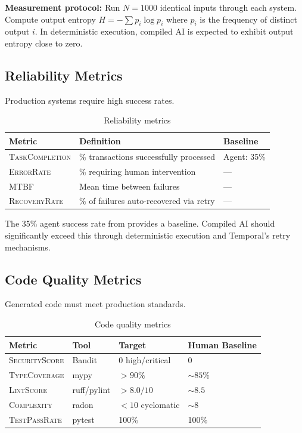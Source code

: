 \documentclass[11pt]{article}
\newcommand{\metric}[1]{\textsc{#1}}
\begin{document}
\textbf{Measurement protocol:} Run $N=1000$ identical inputs through each system. Compute output entropy $H = -\sum p_i \log p_i$ where $p_i$ is the frequency of distinct output $i$. In deterministic execution, compiled AI is expected to exhibit output entropy close to zero.

\subsection{Reliability Metrics}

Production systems require high success rates.

\begin{table}[ht]
\centering
\caption{Reliability metrics}
\label{tab:reliability-metrics}
\begin{tabular}{p{3.5cm}p{5.5cm}p{3cm}}
\toprule
Metric & Definition & Baseline \\
\midrule
\metric{TaskCompletion} & \% transactions successfully processed & Agent: 35\% \\
\metric{ErrorRate} & \% requiring human intervention & --- \\
\metric{MTBF} & Mean time between failures & --- \\
\metric{RecoveryRate} & \% of failures auto-recovered via retry & --- \\
\bottomrule
\end{tabular}
\end{table}

The 35\% agent success rate from \citet{salesforce2025agents} provides a baseline. Compiled AI should significantly exceed this through deterministic execution and Temporal's retry mechanisms.

\subsection{Code Quality Metrics}

Generated code must meet production standards.

\begin{table}[ht]
\centering
\caption{Code quality metrics}
\label{tab:quality-metrics}
\begin{tabular}{p{3.5cm}p{3cm}p{3cm}p{2.5cm}}
\toprule
Metric & Tool & Target & Human Baseline \\
\midrule
\metric{SecurityScore} & Bandit & 0 high/critical & 0 \\
\metric{TypeCoverage} & mypy & $> 90\%$ & $\sim 85\%$ \\
\metric{LintScore} & ruff/pylint & $> 8.0/10$ & $\sim 8.5$ \\
\metric{Complexity} & radon & $< 10$ cyclomatic & $\sim 8$ \\
\metric{TestPassRate} & pytest & 100\% & 100\% \\
\bottomrule
\end{tabular}
\end{table}
\end{document}
